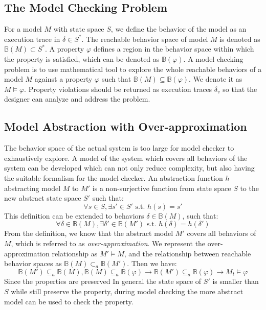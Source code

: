 \subsection{The Model Checking Problem}
For a model $M$ with state space $S$, we define the behavior of the model as an execution trace in $\delta\in S^*$. The reachable behavior space of model $M$ is denoted as $\mathbb{B}(M)\subset S^*$. A property $\varphi$ defines a region in the behavior space within which the property is satisfied, which can be denoted as $\mathbb{B}(\varphi)$. A model checking problem is to use mathematical tool to explore the whole reachable behaviors of a model $M$ against a property $\varphi$ such that $\mathbb{B}(M)\subseteq \mathbb{B}(\varphi)$. We denote it as $M\models\varphi$. Property violations should be returned as execution traces $\delta_v$ so that the designer can analyze and address the problem. 

\subsection{Model Abstraction with Over-approximation}
The behavior space of the actual system is too large for model checker to exhaustively explore. A model of the system which covers all behaviors of the system can be developed which can not only reduce complexity, but also having the suitable formalism for the model checker. An abstraction function $h$ abstracting model $M$ to $M'$ is a non-surjective function from state space $S$ to the new abstract state space $S'$ such that: 
$$\forall s\in S, \exists s'\in S' \text{ s.t. } h(s)=s'$$
This definition can be extended to behaviors $\delta\in \mathbb{B}(M)$, such that:
$$\forall \delta\in \mathbb{B}(M),\exists \delta'\in\mathbb{B}(M')\text{ s.t. } h(\delta)=h(\delta')$$
From the definition, we know that the abstract model $M'$ covers all behaviors of $M$, which is referred to as \emph{over-approximation}. We represent the over-approximation relationship as $M'\models M$, and the relationship between reachable behavior spaces as $\mathbb{B}(M)\subset_a\mathbb{B}(M')$. Then we have:
$$\mathbb{B}(M')\subseteq_a \mathbb{B}(M),\mathbb{B}(M)\subseteq_a \mathbb{B}(\varphi)\rightarrow\mathbb{B}(M')\subseteq_a \mathbb{B}(\varphi)\rightarrow M_t\models\varphi$$
Since the properties are preserved In general the state space of $S'$ is smaller than $S$ while still preserve the property, during model checking the more abstract model can be used to check the property. 

